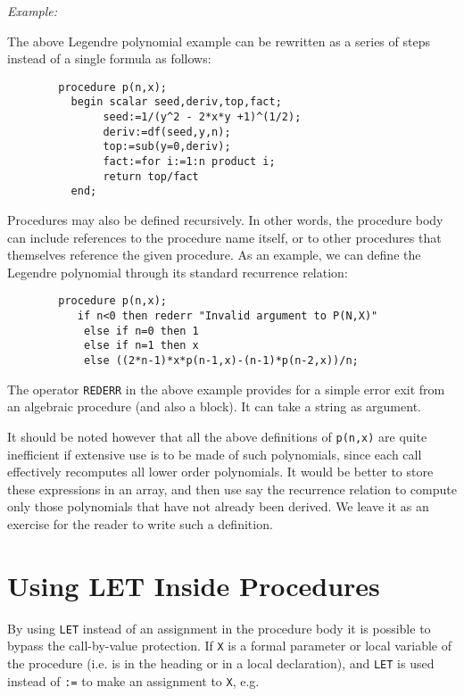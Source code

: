 \textit{Example:}

The above Legendre polynomial example can be rewritten as a series of steps
instead of a single formula as follows:
\begin{verbatim}
        procedure p(n,x);
          begin scalar seed,deriv,top,fact;
               seed:=1/(y^2 - 2*x*y +1)^(1/2);
               deriv:=df(seed,y,n);
               top:=sub(y=0,deriv);
               fact:=for i:=1:n product i;
               return top/fact
          end;
\end{verbatim}
Procedures may also be defined recursively.  In other words, the procedure
body can include references to the procedure name
itself, or to other procedures that themselves reference the given
procedure.  As an example, we can define the Legendre polynomial through
its standard recurrence relation:
\begin{verbatim}
        procedure p(n,x);
           if n<0 then rederr "Invalid argument to P(N,X)"
            else if n=0 then 1
            else if n=1 then x
            else ((2*n-1)*x*p(n-1,x)-(n-1)*p(n-2,x))/n;
\end{verbatim}

\hypertarget{operator:REDERR}{}
The operator \texttt{REDERR} in the above example provides
for a simple error exit from an algebraic procedure (and also a block).
It can take a string as argument.

It should be noted however that all the above definitions of \texttt{p(n,x)} are
quite inefficient if extensive use is to be made of such polynomials, since
each call effectively recomputes all lower order polynomials. It would be
better to store these expressions in an array, and then use say the
recurrence relation to compute only those polynomials that have not already
been derived. We leave it as an exercise for the reader to write such a
definition.


\section{Using LET Inside Procedures}

By using \texttt{LET} instead of an assignment in the procedure
body it is possible to bypass the call-by-value
 protection.  If \texttt{X} is a formal parameter or local
variable of the procedure (i.e. is in the heading or in a local
declaration), and \texttt{LET} is used instead of \texttt{:=} to make an
assignment to \texttt{X}, e.g.

